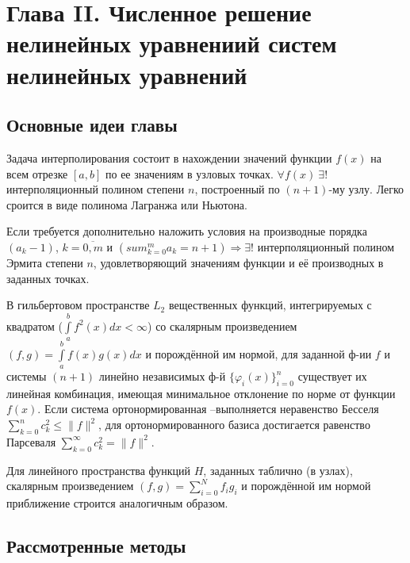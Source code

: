 \newpage
{}
\pagestyle{empty}
\vspace{0.5cm}

\section*{Глава II. Численное решение нелинейных уравнениий систем нелинейных уравнений}

\subsection{Основные идеи главы} 

    Задача интерполирования состоит в нахождении значений функции $f(x)$
    на всем отрезке $[a,b]$ по ее значениям в узловых точках. $\forall f(x)~\exists!$ интерполяционный полином степени $n$, построенный по $(n+1)$-му узлу. Легко сроится в виде полинома Лагранжа или Ньютона.

Если требуется дополнительно наложить условия на производные порядка $(a_k-1)$, $k = \overline{0,m}$ и $(sum_{k=0}^m a_k = n + 1) \Rightarrow \exists!$ интерполяционный полином Эрмита степени $n$, удовлетворяющий значениям функции и её производных в заданных точках.

В гильбертовом пространстве $L_2$ вещественных функций, интегрируемых с квадратом ($\int\limits_a^b{f^2(x)dx} < \infty$) со скалярным произведением $(f,g)=\int\limits_a^b{f(x)g(x)dx}$ и порождённой им нормой, для заданной ф-ии $f$ и системы $(n+1)$ линейно независимых ф-й $\{\varphi_i(x)\}_{i=0}^n$ существует их линейная комбинация, имеющая минимальное отклонение по норме от функции $f(x)$. Если система ортонормированная –выполняется неравенство Бесселя $\sum_{k=0}^n c_k^2 \leqslant \|f\|^2$, для ортонормированного базиса достигается равенство Парсеваля $\sum_{k=0}^\infty c_k^2 = \|f\|^2.$

Для линейного пространства функций $H$, заданных таблично (в узлах),  скалярным произведением $(f,g) = \sum\limits_{i=0}^N f_i g_i$ и порождённой им нормой приближение строится аналогичным образом.

\subsection{Рассмотренные методы}